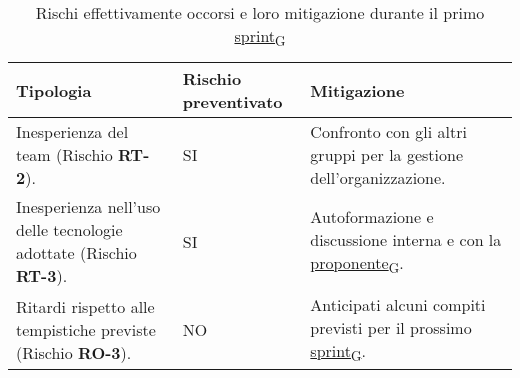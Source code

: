 \newpage
{}
\begin{table}[!h]
	\centering
	\begin{tabular}{ | p{6cm} | p{2.5cm} | p{7.5cm} | }
		\hline
		\textbf{Tipologia}                                                       & \textbf{Rischio preventivato} & \textbf{Mitigazione}                                                \\
		\hline
		Inesperienza del team (Rischio \textbf{RT-2}).                           & SI                            & Confronto con gli altri gruppi per la gestione dell'organizzazione. \\
		\hline
		Inesperienza nell'uso delle tecnologie adottate (Rischio \textbf{RT-3}). & SI                            & Autoformazione e discussione interna e con la \href{https://7last.github.io/docs/pb/documentazione-interna/glossario\#proponente}{proponente\textsubscript{G}}.           \\
		\hline
		Ritardi rispetto alle tempistiche previste (Rischio \textbf{RO-3}).      & NO                            & Anticipati alcuni compiti previsti per il prossimo \href{https://7last.github.io/docs/pb/documentazione-interna/glossario\#sprint}{sprint\textsubscript{G}}.          \\
		\hline
	\end{tabular}
	\caption{Rischi effettivamente occorsi e loro mitigazione durante il primo \href{https://7last.github.io/docs/pb/documentazione-interna/glossario\#sprint}{sprint\textsubscript{G}}}
	
\end{table}

